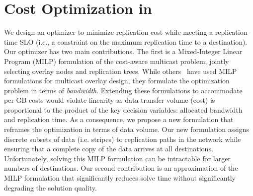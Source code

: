 \section{Cost Optimization in \sys{}}
\label{sec:optimization}

We design an optimizer to minimize replication cost while meeting a replication time SLO (i.e., a constraint on the maximum replication time to a destination).
Our optimizer has two main contributions.
The first is a Mixed-Integer Linear Program (MILP) formulation of the cost-aware multicast problem, jointly selecting overlay nodes and replication trees. 
While others~\cite{zhang2018bds, ganguly2005fast} have used MILP formulations for multicast overlay design, they formulate the optimization problem in terms of \textit{bandwidth}.
Extending these formulations to accommodate per-GB costs would violate linearity as data transfer volume (cost) is proportional to the product of the key decision variables: allocated bandwidth and replication time.
As a consequence, we propose a  new formulation that reframes the optimization in terms of data volume. 
Our new formulation assigns discrete subsets of data (i.e. stripes) to replication paths in the network while ensuring that a complete copy of the data arrives at all destinations.
Unfortunately, solving this MILP formulation can be intractable for larger numbers of destinations.
Our second contribution is an approximation of the MILP formulation that significantly reduces solve time without significantly degrading the solution quality.



\newcommand{\flowmax}[0]{\small{\textsc{bandwidth}}^{path}}
\newcommand{\volume}[0]{\textsc{volume}}
\newcommand{\connectionlimit}[0]{\small{\textsc{Limit}}^{conn}}
\newcommand{\frob}[2]{\langle #1, #2 \rangle}

\newcommand{\dest}[0]{\small{\textsc{dest}}}
\newcommand{\node}[0]{\textit{VM}}
\newcommand{\capacitye}[0]{\small{\textsc{capacity}^\textit{path}}}
\newcommand{\capacityiegress}[0]{\small{\textsc{egress}^\node}}
\newcommand{\capacityiingress}[0]{\small{\textsc{ingress}^\node}}
\newcommand{\capacityvmegress}[0]{\small{\textsc{vmegress}^\node}}
\newcommand{\capacityvmingress}[0]{\small{\textsc{vmingress}^\node}}
\newcommand{\maxinstances}[0]{\textsc{limit}^\node}

